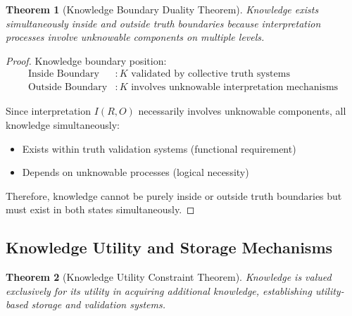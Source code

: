 \documentclass[12pt,a4paper]{article}
\newtheorem{theorem}{Theorem}[section]
\begin{document}
\begin{theorem}[Knowledge Boundary Duality Theorem]
Knowledge exists simultaneously inside and outside truth boundaries because interpretation processes involve unknowable components on multiple levels.
\end{theorem}

\begin{proof}
Knowledge boundary position:
\begin{align}
\text{Inside Boundary} &: K \text{ validated by collective truth systems} \\
\text{Outside Boundary} &: K \text{ involves unknowable interpretation mechanisms}
\end{align}

Since interpretation $I(R,O)$ necessarily involves unknowable components, all knowledge simultaneously:
\begin{itemize}
\item Exists within truth validation systems (functional requirement)
\item Depends on unknowable processes (logical necessity)
\end{itemize}

Therefore, knowledge cannot be purely inside or outside truth boundaries but must exist in both states simultaneously.
\end{proof}

\subsection{Knowledge Utility and Storage Mechanisms}

\begin{theorem}[Knowledge Utility Constraint Theorem]
Knowledge is valued exclusively for its utility in acquiring additional knowledge, establishing utility-based storage and validation systems.
\end{theorem}
\end{document}
